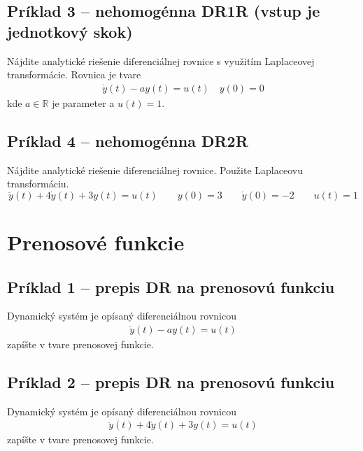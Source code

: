 \documentclass[a4paper, 10pt, ]{article}
\begin{document}
\subsection{Príklad 3 --  nehomogénna DR1R (vstup je jednotkový skok)}
\label{s1pr3}

Nájdite analytické riešenie diferenciálnej rovnice s využitím Laplaceovej transformácie. Rovnica je tvare
\begin{align}
    \dot y(t) - a y(t) = u(t) \quad y(0) = 0
\end{align}
kde $a \in \mathbb R$ je parameter a $u(t) = 1$.




\subsection{Príklad 4 --  nehomogénna DR2R}

Nájdite analytické riešenie diferenciálnej rovnice. Použite Laplaceovu transformáciu.
\begin{equation} 
    \ddot y(t) + 4 \dot y(t) + 3y(t) = u(t)    \qquad y(0) = 3 \qquad \dot y(0) = -2  \qquad u(t) = 1 
\end{equation}




\section{Prenosové funkcie}


\subsection{Príklad 1 -- prepis DR na prenosovú funkciu}

Dynamický systém je opísaný diferenciálnou rovnicou
\begin{align}
    \dot y(t) - a y(t) = u(t) 
\end{align}
zapíšte v tvare prenosovej funkcie.





\subsection{Príklad 2 -- prepis DR na prenosovú funkciu}

Dynamický systém je opísaný diferenciálnou rovnicou
\begin{align}
    \ddot y(t) + 4 \dot y(t) + 3y(t) = u(t)
\end{align}
zapíšte v tvare prenosovej funkcie.
\end{document}
